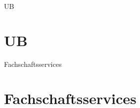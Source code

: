 
\begin{frame}{UB}
  \section{UB}
\end{frame}


\begin{frame}{Fachschaftsservices}
  \section{Fachschaftsservices}
\end{frame}



